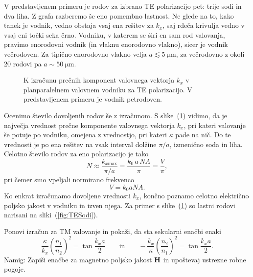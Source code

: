 V predstavljenem primeru je rodov za izbrano TE polarizacijo pet: trije sodi in dva liha. 
Z grafa razberemo 
še eno pomembno lastnost. Ne glede na to, kako tanek je vodnik, vedno obstaja vsaj ena rešitev za $k_x$, 
saj rdeča krivulja vedno v vsaj eni točki seka črno. Vodniku, v katerem se širi en sam rod valovanja, 
pravimo enorodovni vodnik (in vlaknu enorodovno vlakno), 
sicer je vodnik večrodoven. Za tipično enorodovno vlakno velja 
$a\lesssim 5~\si{\micro\meter}$, za večrodovno z okoli 20 rodovi pa $a\sim 50~\si{\micro\meter}$.
\begin{figure}[h]
\centering
\def\svgwidth{90truemm} 

\caption{K izračunu prečnih komponent valovnega vektorja $k_x$ v planparalelnem valovnem vodniku
za TE polarizacijo. V predstavljenem primeru je vodnik petrodoven.}
\label{fig:TEsec}
\end{figure}

Ocenimo število dovoljenih rodov še z izračunom. S slike~(\ref{fig:TEsec}) vidimo, da je največja 
vrednost prečne komponente valovnega vektorja $k_x$, pri kateri valovanje še potuje po vodniku, omejena z vrednostjo, 
pri kateri $\kappa$ pade na nič. Do te vrednosti je po ena rešitev na vsak interval dolžine $\pi/a$, izmenično
soda in liha. Celotno število rodov za eno polarizacijo je tako
\begin{equation}
N \approx \frac{k_{x\mathrm{max}}}{\pi/a}  = \frac{k_0\, a\, NA }{\pi} = \frac{V}{\pi},
\end{equation}
pri  čemer smo vpeljali normirano frekvenco
\begin{equation}
V = k_0 a NA.
\end{equation}
Ko enkrat izračunamo dovoljene vrednosti $k_x$, končno poznamo celotno električno poljsko
jakost v vodniku in izven njega. Za primer s slike~(\ref{fig:TEsec}) so lastni rodovi
narisani na sliki~(\ref{fig:TESodi}).

\begin{definition}
\label{naloga:TM}
Ponovi izračun za TM valovanje in pokaži, da sta sekularni enačbi enaki 
\begin{equation}
\frac{\kappa}{k_x} \left(\frac{n_1}{n_2}\right)^2= 
\tan \frac{k_x a}{2} \qquad \mathrm{in} \qquad -\frac{k_x}{\kappa} \left(\frac{n_2}{n_1}\right)^2= 
\tan \frac{k_x a}{2}.
\end{equation}
Namig: Zapiši enačbe za magnetno poljsko jakost ${\bf H}$ in upoštevaj ustrezne robne pogoje.
\end{definition}


